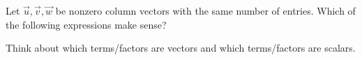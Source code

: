 \documentclass{ximera}
\author{Bart Snapp}
\begin{document}
\begin{exercise}
  Let $\vec{u},\vec{v},\vec{w}$ be nonzero column vectors with the same
  number of entries. Which of the following expressions make sense?
  \begin{selectAll}
    \pdfOnly{\end{multicols}}
  \end{selectAll}
  \begin{hint}
    Think about which terms/factors are vectors and which
    terms/factors are scalars.
  \end{hint}
\end{exercise}
\end{document}
